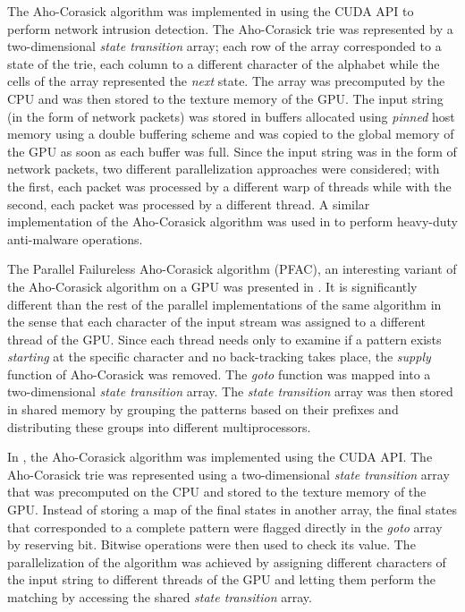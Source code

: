 \documentclass{ws-ijait}
\begin{document}
The Aho-Corasick algorithm was implemented in \cite{Vasiliadis2008} using the CUDA API to perform network intrusion detection. The Aho-Corasick trie was represented by a two-dimensional \textit{state transition} array; each row of the array corresponded to a state of the trie, each column to a different character of the alphabet  while the cells of the array represented the \textit{next} state. The array was precomputed by the CPU and was then stored to the texture memory of the GPU. The input string (in the form of network packets) was stored in buffers allocated using \textit{pinned} host memory using a double buffering scheme and was copied to the global memory of the GPU as soon as each buffer was full. Since the input string was in the form of network packets, two different parallelization approaches were considered; with the first, each packet was processed by a different warp of threads while with the second, each packet was processed by a different thread. A similar implementation of the Aho-Corasick algorithm was used in \cite{Vasiliadis2010} to perform heavy-duty anti-malware operations.

The Parallel Failureless Aho-Corasick algorithm (PFAC), an interesting variant of the Aho-Corasick algorithm on a GPU was presented in \cite{Lin2010}. It is significantly different than the rest of the parallel implementations of the same algorithm in the sense that each character of the input stream was assigned to a different thread of the GPU. Since each thread needs only to examine if a pattern exists \textit{starting} at the specific character and no back-tracking takes place, the \textit{supply} function of Aho-Corasick was removed. The \textit{goto} function was mapped into a two-dimensional \textit{state transition} array. The \textit{state transition} array was then stored in shared memory by grouping the patterns based on their prefixes and distributing these groups into different multiprocessors.

In \cite{Tumeo2011}, the Aho-Corasick algorithm was implemented using the CUDA API. The Aho-Corasick trie was represented using a two-dimensional \textit{state transition} array that was precomputed on the CPU and stored to the texture memory of the GPU. Instead of storing a map of the final states in another array, the final states that corresponded to a complete pattern were flagged directly in the \textit{goto} array by reserving  bit. Bitwise operations were then used to check its value. The parallelization of the algorithm was achieved by assigning different characters of the input string to different threads of the GPU and letting them perform the matching by accessing the shared \textit{state transition} array.
\end{document}
